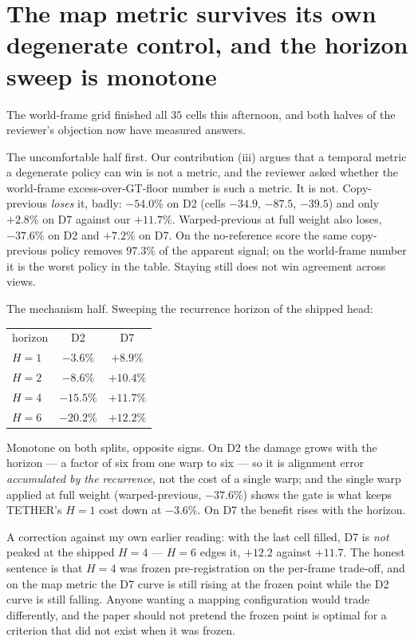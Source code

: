 \documentclass[11pt,a4paper]{article}
\begin{document}
\section*{The map metric survives its own degenerate control, and the horizon sweep is monotone}

The world-frame grid finished all $35$ cells this afternoon, and both halves of
the reviewer's objection now have measured answers.

The uncomfortable half first. Our contribution (iii) argues that a temporal
metric a degenerate policy can win is not a metric, and the reviewer asked
whether the world-frame excess-over-GT-floor number is such a metric. It is
not. Copy-previous \emph{loses} it, badly: $-54.0\%$ on D2 (cells $-34.9$,
$-87.5$, $-39.5$) and only $+2.8\%$ on D7 against our $+11.7\%$. Warped-previous
at full weight also loses, $-37.6\%$ on D2 and $+7.2\%$ on D7. On the
no-reference score the same copy-previous policy removes $97.3\%$ of the
apparent signal; on the world-frame number it is the worst policy in the table.
Staying still does not win agreement across views.

The mechanism half. Sweeping the recurrence horizon of the shipped head:

\begin{center}
\begin{tabular}{lcc}
horizon & D2 & D7 \\
$H{=}1$ & $-3.6\%$ & $+8.9\%$ \\
$H{=}2$ & $-8.6\%$ & $+10.4\%$ \\
$H{=}4$ & $-15.5\%$ & $+11.7\%$ \\
$H{=}6$ & $-20.2\%$ & $+12.2\%$ \\
\end{tabular}
\end{center}

Monotone on both splits, opposite signs. On D2 the damage grows with the
horizon --- a factor of six from one warp to six --- so it is alignment error
\emph{accumulated by the recurrence}, not the cost of a single warp; and the
single warp applied at full weight (warped-previous, $-37.6\%$) shows the gate
is what keeps TETHER's $H{=}1$ cost down at $-3.6\%$. On D7 the benefit rises
with the horizon.

A correction against my own earlier reading: with the last cell filled, D7 is
\emph{not} peaked at the shipped $H{=}4$ --- $H{=}6$ edges it, $+12.2$ against
$+11.7$. The honest sentence is that $H{=}4$ was frozen pre-registration on the
per-frame trade-off, and on the map metric the D7 curve is still rising at the
frozen point while the D2 curve is still falling. Anyone wanting a mapping
configuration would trade differently, and the paper should not pretend the
frozen point is optimal for a criterion that did not exist when it was frozen.
\end{document}
